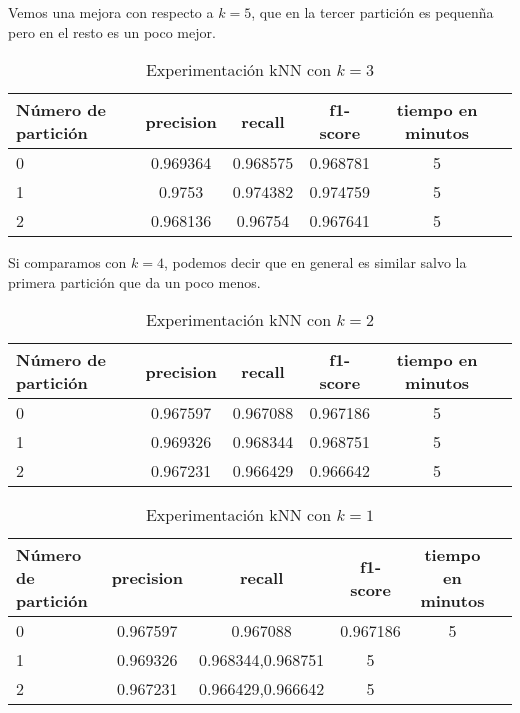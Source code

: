 Vemos una mejora con respecto a $k=5$, que en la tercer partici\'on es pequen\~na pero en el resto es un poco mejor.

\begin{table}[H]
\centering
\begin{tabular}{| l | c | c | c | c | c |}
\hline
N\'umero de partici\'on & precision & recall & f1-score & tiempo en minutos \\
\hline

0 & 0.969364 & 0.968575 & 0.968781 & 5 \\
1 & 0.9753 & 0.974382 & 0.974759 & 5 \\
2 & 0.968136 & 0.96754 & 0.967641 & 5 \\

\hline
\end{tabular}
\caption{Experimentaci\'on kNN con $k=3$}
\end{table}

Si comparamos con $k=4$, podemos decir que en general es similar salvo la primera partici\'on que da un poco menos.

\begin{table}[H]
\centering
\begin{tabular}{| l | c | c | c | c | c |}
\hline
N\'umero de partici\'on & precision & recall & f1-score & tiempo en minutos \\
\hline

0 & 0.967597 & 0.967088 & 0.967186 & 5 \\
1 & 0.969326 & 0.968344 & 0.968751 & 5 \\
2 & 0.967231 & 0.966429 & 0.966642 & 5 \\

\hline
\end{tabular}
\caption{Experimentaci\'on kNN con $k=2$}
\end{table}


\begin{table}[H]
\centering
\begin{tabular}{| l | c | c | c | c | c |}
\hline
N\'umero de partici\'on & precision & recall & f1-score & tiempo en minutos \\
\hline

0 & 0.967597 & 0.967088 & 0.967186 & 5 \\
1 & 0.969326 & 0.968344,0.968751 & 5 \\
2 & 0.967231 & 0.966429,0.966642 & 5 \\

\hline
\end{tabular}
\caption{Experimentaci\'on kNN con $k=1$}
\end{table}


